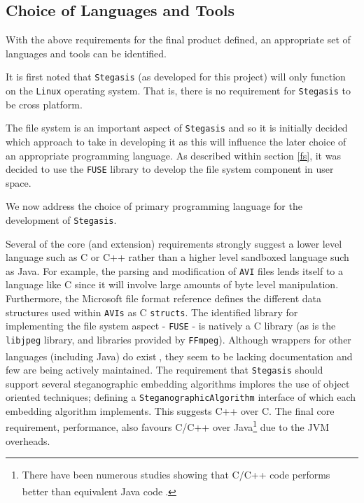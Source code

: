 \documentclass[paper=a4, fontsize=11pt,twoside]{scrartcl}
\numberwithin{table}{section}
\numberwithin{figure}{section}
\numberwithin{algorithm}{section}
\begin{document}
\subsection{Choice of Languages and Tools}

With the above requirements for the final product defined, an appropriate set of languages and tools can be identified.

It is first noted that \texttt{Stegasis} (as developed for this project) will only function on the \texttt{Linux} operating system. That is, there is no requirement for \texttt{Stegasis} to be cross platform.  

The file system is an important aspect of \texttt{Stegasis} and so it is initially decided which approach to take in developing it as this will influence the later choice of an appropriate programming language. As described within section \ref{fs}, it was decided to use the \texttt{FUSE} library to develop the file system component in user space.

We now address the choice of primary programming language for the development of \texttt{Stegasis}.

Several of the core (and extension) requirements strongly suggest a lower level language such as C or C++ rather than a higher level sandboxed language such as Java. For example, the parsing and modification of \texttt{AVI} files lends itself to a language like C since it will involve large amounts of byte level manipulation. Furthermore, the Microsoft file format reference defines the different data structures used within \texttt{AVIs} as C \texttt{structs}. The identified library for implementing the file system aspect - \texttt{FUSE} - is natively a C library (as is the \texttt{libjpeg} library, and libraries provided by \texttt{FFmpeg}). Although wrappers for other languages (including Java) do exist\textsuperscript{\cite{javafuse} \cite{turbojpeg}}, they seem to be lacking documentation and few are being actively maintained. The requirement that \texttt{Stegasis} should support several steganographic embedding algorithms implores the use of object oriented techniques; defining a \texttt{SteganographicAlgorithm} interface of which each embedding algorithm implements. This suggests C++ over C. The final core requirement, performance, also favours C/C++ over Java\footnote{There have been numerous studies showing that C/C++ code performs better than equivalent Java code\textsuperscript{\cite{javaper1} \cite{javaper2} \cite{javaper3}}.} due to the JVM overheads. 
\end{document}
